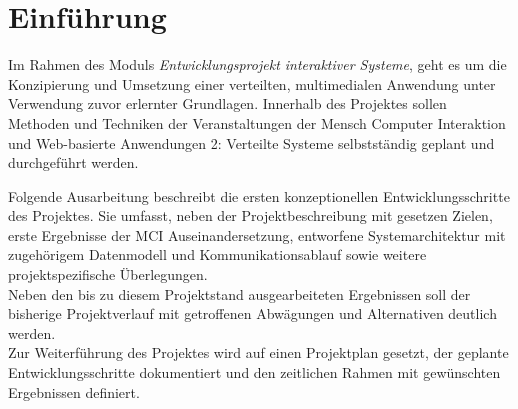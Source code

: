 
\chapter{Einführung}
Im Rahmen des Moduls \textit{Entwicklungsprojekt interaktiver Systeme}, geht es um die Konzipierung und Umsetzung einer verteilten, multimedialen Anwendung unter Verwendung zuvor erlernter Grundlagen. Innerhalb des Projektes sollen Methoden und Techniken der Veranstaltungen der Mensch Computer Interaktion und Web-basierte Anwendungen 2: Verteilte Systeme selbstständig geplant und durchgeführt werden.

\vspace{0.5cm}

Folgende Ausarbeitung beschreibt die ersten konzeptionellen Entwicklungsschritte des Projektes. Sie umfasst, neben der  Projektbeschreibung mit gesetzen Zielen, erste Ergebnisse der MCI Auseinandersetzung, entworfene Systemarchitektur mit zugehörigem Datenmodell und Kommunikationsablauf sowie weitere projektspezifische Überlegungen.\\
Neben den bis zu diesem Projektstand ausgearbeiteten Ergebnissen soll der bisherige Projektverlauf mit getroffenen Abwägungen und Alternativen deutlich werden.\\
Zur Weiterführung des Projektes wird auf einen Projektplan gesetzt, der geplante Entwicklungsschritte dokumentiert und den zeitlichen Rahmen mit gewünschten Ergebnissen definiert.
